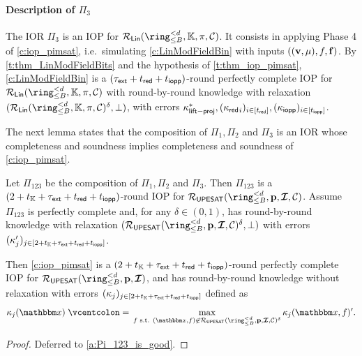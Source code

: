 \documentclass[11pt,letterpaper,usenames,dvipsnames]{article}
\begin{document}
\paragraph{Description of $\Pi_3$}


The IOR $\Pi_3$ is an IOP for $\LIN(\ringtwobounds{B}{\moduledegree},\KK,\pi,\cC)$. It consists  in applying Phase 4 of \cref{c:iop_pimsat}, i.e.\ simulating \cref{c:LinModFieldBin} with inputs $((\mathbf{v},\mu), f,\mathbf{f})$. By \cref{t:thm_LinModFieldBits} and the hypothesis of \cref{t:thm_iop_pimsat}, \cref{c:LinModFieldBin} is a $(\tau_{\mathsf{\mathsf{ext}}}+t_{\mathsf{red}}+t_{\mathsf{iopp}})$-round perfectly complete IOP for $\LIN(\ringtwobounds{B}{\moduledegree},\KK,\pi,\cC)$ with round-by-round knowledge with relaxation $(\LIN(\ringtwobounds{B}{\moduledegree},\KK,\pi,\cC)^\delta,\bot)$, with errors $\kappa_{\mathsf{lift-proj}}^*, ({\kappa_{\mathsf{red}}}_i)_{i\in [t_{\mathsf{red}}]}, ({\kappa_{\mathsf{iopp}}})_{i\in [t_{\mathsf{iopp}}]}$.


The next lemma states that the composition of $\Pi_1, \Pi_2$ and $\Pi_3$ is an IOR whose completeness and soundness implies completeness and soundness of \cref{c:iop_pimsat}.

\begin{lemma}\label{l:Pi_123_is_good}
Let $\Pi_{123}$ be the composition of $\Pi_1,\Pi_2$ and $\Pi_3$.  Then $\Pi_{123}$ is a $(2+t_{\mathbb{K}} + \tau_{\mathsf{ext}} +t_{\mathsf{red}} + t_{\mathsf{iopp}})$-round IOP for $\PIMSAT(\ringtwobounds{B}{\moduledegree}, \pp,\bm{\ideal}, \cC)$. Assume $\Pi_{123}$ is perfectly complete and, for any $\delta\in (0,1)$,  has round-by-round knowledge with relaxation $(\PIMSAT(\ringtwobounds{B}{\moduledegree}, \pp,\bm{\ideal}, \cC)^\delta, \bot)$ with errors $(\kappa_j')_{j\in [2+t_{\mathbb{K}} + \tau_{\mathsf{ext}} +t_{\mathsf{red}} + t_{\mathsf{iopp}}]}$. 

Then \cref{c:iop_pimsat} is a $(2+t_{\mathbb{K}} + \tau_{\mathsf{ext}} +t_{\mathsf{red}} + t_{\mathsf{iopp}})$-round perfectly complete IOP for $\PIMSAT(\ringtwobounds{B}{\moduledegree}, \pp,\bm{\ideal})$,  and has  round-by-round knowledge without relaxation with errors $(\kappa_j)_{j\in [2+t_{\mathbb{K}} + \tau_{\mathsf{ext}} +t_{\mathsf{red}} + t_{\mathsf{iopp}}]}$ defined as
%
$$
\kappa_j(\inp) \defeq \max_{f \text{ s.t. } (\inp,f)\not\in \PIMSAT(\ringtwobounds{B}{\moduledegree}, \pp,\bm{\ideal}, \cC)^\delta} \kappa_j(\inp, f)'.
$$
\end{lemma}
\begin{proof}
    Deferred to \cref{a:Pi_123_is_good}.
\end{proof}
\end{document}
